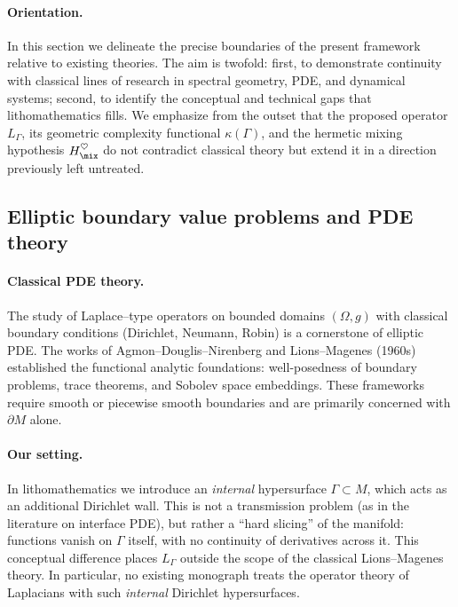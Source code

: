 \paragraph{Orientation.}
In this section we delineate the precise boundaries of the present framework relative to existing theories. 
The aim is twofold: first, to demonstrate continuity with classical lines of research in spectral geometry, PDE, and dynamical systems; 
second, to identify the conceptual and technical gaps that lithomathematics fills. 
We emphasize from the outset that the proposed operator $L_\Gamma$, 
its geometric complexity functional $\kappa(\Gamma)$, 
and the hermetic mixing hypothesis $H_{\mix}^\heartsuit$ 
do not contradict classical theory but extend it in a direction previously left untreated. 

\subsection{Elliptic boundary value problems and PDE theory}

\paragraph{Classical PDE theory.}
The study of Laplace--type operators on bounded domains $(\Omega,g)$ with classical boundary conditions (Dirichlet, Neumann, Robin) 
is a cornerstone of elliptic PDE. 
The works of Agmon--Douglis--Nirenberg and Lions--Magenes (1960s) 
established the functional analytic foundations: well-posedness of boundary problems, trace theorems, and Sobolev space embeddings. 
These frameworks require smooth or piecewise smooth boundaries and are primarily concerned with $\partial M$ alone.

\paragraph{Our setting.}
In lithomathematics we introduce an \emph{internal} hypersurface $\Gamma\subset M$, 
which acts as an additional Dirichlet wall. 
This is not a transmission problem (as in the literature on interface PDE), 
but rather a ``hard slicing'' of the manifold: 
functions vanish on $\Gamma$ itself, with no continuity of derivatives across it. 
This conceptual difference places $L_\Gamma$ outside the scope of the classical Lions--Magenes theory. 
In particular, no existing monograph treats the operator theory of Laplacians with such \emph{internal} Dirichlet hypersurfaces. 

